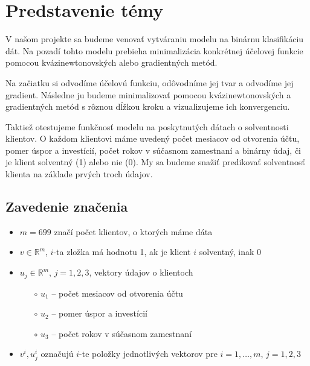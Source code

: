 \documentclass[report.tex]{subfiles}
\begin{document}
	
\section{Predstavenie témy}	

V našom projekte sa budeme venovať vytváraniu modelu na binárnu klasifikáciu dát. Na pozadí tohto modelu prebieha minimalizácia konkrétnej účelovej funkcie pomocou kvázinewtonovských alebo gradientných metód. 

Na začiatku si odvodíme účelovú funkciu, odôvodníme jej tvar a odvodíme jej gradient. Následne ju budeme minimalizovať pomocou kvázinewtonovských a gradientných metód s rôznou dĺžkou kroku a vizualizujeme ich konvergenciu. 

Taktiež otestujeme funkčnosť modelu na poskytnutých dátach o solventnosti klientov. O každom klientovi máme uvedený počet mesiacov od otvorenia účtu, pomer úspor a investícií, počet rokov v súčasnom zamestnaní a binárny údaj, či je klient solventný (1) alebo nie (0). My sa budeme snažiť predikovať solventnosť klienta na základe prvých troch údajov. 

\subsection{Zavedenie značenia}

\begin{itemize}
	\item $m = 699$ značí počet klientov, o ktorých máme dáta
	\item $v \in \mathbb{R}^m$, $i$-ta zložka má hodnotu 1, ak je klient $i$ solventný, inak 0
	\item $u_j \in \mathbb{R}^m$, $j=1,2,3$, vektory údajov o klientoch
	\begin{itemize}
		\item[$\circ$] $u_1$ -- počet mesiacov od otvorenia účtu
		\item[$\circ$] $u_2$ -- pomer úspor a investícií
		\item[$\circ$] $u_3$ -- počet rokov v súčasnom zamestnaní
	\end{itemize}
	\item $v^i,u_j^i$ označujú $i$-te položky jednotlivých vektorov pre $i=1,\dots,m$, $j=1,2,3$
\end{itemize}
	
\end{document}
